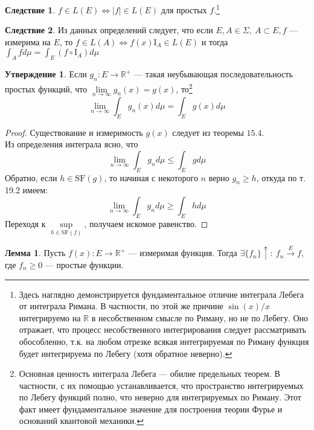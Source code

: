 \documentclass[11pt,a4paper]{report}
\def\Real{\mathbb{R}}
\theoremstyle{definition}
\theoremstyle{definition}
\newtheorem{lemma}{Лемма}[section]
\newtheorem{preposition}{Утверждение}[section]
\newtheorem{corollary}{Следствие}[section]
\theoremstyle{definition}
\begin{document}
		\begin{corollary}
			$ f \in L(E) \iff |f| \in L(E) $ для простых $ f $.\footnote{Здесь наглядно демонстрируется фундаментальное отличие интеграла Лебега от интеграла Римана. В частности, по этой же причине $ \sin(x)/x $ интегрируемо на $ \Real $ в несобственном смысле по Риману, но не по Лебегу. Оно отражает, что процесс несобственного интегрирования следует рассматривать обособленно, т.к. на любом отрезке всякая интегрируемая по Риману функция будет интегрируема по Лебегу (хотя обратное неверно).}
		\end{corollary}
		\begin{corollary}
			Из данных определений следует, что если $ E, A \in \Sigma,\ A \subset E, f $ — измерима на $ E $, то $ f \in L(A) \iff f(x) \mbox{I}_{A} \in L(E) $ и тогда $ \int_{A} f d\mu = \int_{E} (f \circ \mbox{I}_{A}) d\mu  $
		\end{corollary}
		\begin{preposition}
			Если $ g_{n}: E \to \Real^{+} $ — такая неубывающая последовательность простых функций, что $ \lim\limits_{n \to \infty} g_{n}(x) = g(x) $, то\footnote{Основная ценность интеграла Лебега — обилие предельных теорем. В частности, с их помощью устанавливается, что пространство интегрируемых по Лебегу функций полно, что неверно для интегрируемых по Риману. Этот факт имеет фундаментальное значение для построения теории Фурье и оснований квантовой механики.} 
			\[
				\lim\limits_{n\to\infty} \int_{E} g_{n}(x) d\mu = \int_{E} g(x) d\mu
			\]
		\end{preposition}
		\begin{proof}
			Существование и измеримость $ g(x) $ следует из теоремы $ 15.4 $.\\
			Из определения интеграла ясно, что 
			\[ \lim\limits_{n\to\infty} \int_{E} g_{n} d\mu \le \int_{E} g d\mu \]
			Обратно, если $ h \in \mbox{SF}(g) $, то начиная с некоторого $ n $ верно $ g_{n} \ge h $, откуда по т. 19.2 имеем: 
			\[ \lim\limits_{n\to\infty} \int_{E} g_{n} d\mu \ge \int_{E} h d\mu \]
			Переходя к $ \sup\limits_{h \in \mbox{SF}(f)} $, получаем искомое равенство.
		\end{proof}
		\begin{lemma}
			Пусть $ f(x): E \to \Real^{+} $ — измеримая функция. Тогда $ \exists \{f_{n}\}\uparrow:\ f_{n} \xrightarrow{E} f $, где $ f_{n} \geq 0 $  — простые функции.
		\end{lemma}
\end{document}
